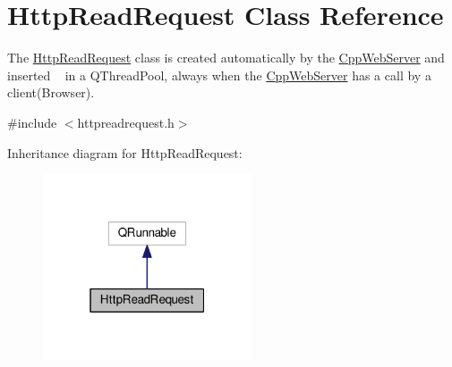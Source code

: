 \hypertarget{class_http_read_request}{}\section{Http\+Read\+Request Class Reference}
\label{class_http_read_request}


The \hyperlink{class_http_read_request}{Http\+Read\+Request} class is created automatically by the \hyperlink{class_cpp_web_server}{Cpp\+Web\+Server} and inserted ~\newline
 in a Q\+Thread\+Pool, always when the \hyperlink{class_cpp_web_server}{Cpp\+Web\+Server} has a call by a client(\+Browser).  




{\ttfamily \#include $<$httpreadrequest.\+h$>$}



Inheritance diagram for Http\+Read\+Request\+:\nopagebreak
\begin{figure}[H]
\begin{center}
\leavevmode
\includegraphics[width=175pt]{class_http_read_request__inherit__graph}
\end{center}
\end{figure}
